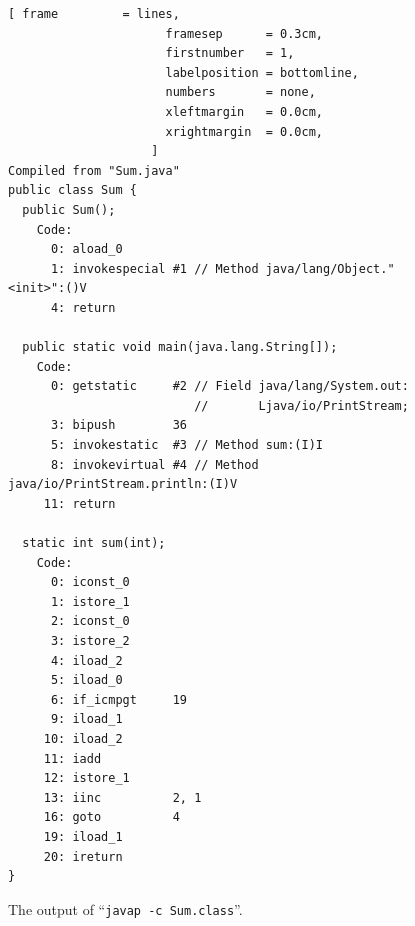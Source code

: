 \begin{figure}[!ht]
\centering
\begin{tcolorbox}[colback=sepia, boxrule=1pt, sharp corners, boxsep=0pt]
    \begin{Verbatim}[ frame         = lines, 
                      framesep      = 0.3cm, 
                      firstnumber   = 1,
                      labelposition = bottomline,
                      numbers       = none,
                      xleftmargin   = 0.0cm,
                      xrightmargin  = 0.0cm,
                    ]
Compiled from "Sum.java"
public class Sum {
  public Sum();
    Code:
      0: aload_0        
      1: invokespecial #1 // Method java/lang/Object."<init>":()V
      4: return        
 
  public static void main(java.lang.String[]);
    Code:
      0: getstatic     #2 // Field java/lang/System.out:
                          //       Ljava/io/PrintStream;
      3: bipush        36
      5: invokestatic  #3 // Method sum:(I)I
      8: invokevirtual #4 // Method java/io/PrintStream.println:(I)V
     11: return        
 
  static int sum(int);
    Code:
      0: iconst_0      
      1: istore_1      
      2: iconst_0      
      3: istore_2      
      4: iload_2        
      5: iload_0        
      6: if_icmpgt     19
      9: iload_1        
     10: iload_2        
     11: iadd          
     12: istore_1      
     13: iinc          2, 1
     16: goto          4
     19: iload_1        
     20: ireturn        
}
\end{Verbatim}
\end{tcolorbox}
\vspace*{-0.3cm}
\caption{The output of ``\texttt{javap -c Sum.class}''.}
\label{fig:Sum.class}
\end{figure}


